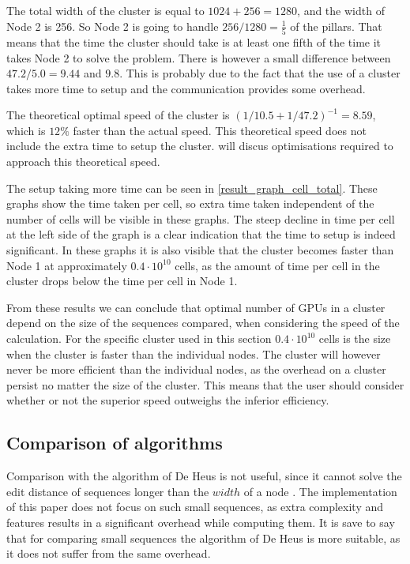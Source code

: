 The total width of the cluster is equal to $1024 + 256 = 1280$, and the width of Node 2 is 256.
So Node 2 is going to handle $256 / 1280 = \frac{1}{5}$ of the pillars.
That means that the time the cluster should take is at least one fifth of the time it takes Node 2 to solve the problem.
There is however a small difference between $47.2 / 5.0 = 9.44$ and $9.8$.
This is probably due to the fact that the use of a cluster takes more time to setup and the communication provides some overhead.

The theoretical optimal speed of the cluster is $(1/10.5 + 1/47.2)^{-1} = 8.59$, which is $12\%$ faster than the actual speed.
This theoretical speed does not include the extra time to setup the cluster.
 will discus optimisations required to approach this theoretical speed.

The setup taking more time can be seen in \cref{result_graph_cell_total}.
These graphs show the time taken per cell, so extra time taken independent of the number of cells will be visible in these graphs.
The steep decline in time per cell at the left side of the graph is a clear indication that the time to setup is indeed significant.
In these graphs it is also visible that the cluster becomes faster than Node 1 at approximately $0.4 \cdot 10^{10}$ cells, as the amount of time per cell in the cluster drops below the time per cell in Node 1.

From these results we can conclude that optimal number of GPUs in a cluster depend on the size of the sequences compared, when considering the speed of the calculation.
For the specific cluster used in this section $0.4 \cdot 10^{10}$ cells is the size when the cluster is faster than the individual nodes.
The cluster will however never be more efficient than the individual nodes, as the overhead on a cluster persist no matter the size of the cluster.
This means that the user should consider whether or not the superior speed outweighs the inferior efficiency.

\subsection{Comparison of algorithms}
Comparison with the algorithm of De Heus is not useful, since it cannot solve the edit distance of sequences longer than the $width$ of a node \cite{Heus}.
The implementation of this paper does not focus on such small sequences, as extra complexity and features results in a significant overhead while computing them.
It is save to say that for comparing small sequences the algorithm of De Heus is more suitable, as it does not suffer from the same overhead.



